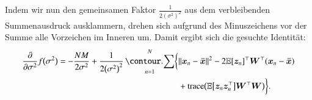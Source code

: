 Indem wir nun den gemeinsamen Faktor $\frac{1}{2(\sigma^2)^2}$ aus dem verbleibenden Summenausdruck ausklammern, drehen sich aufgrund des Minuszeichens vor der Summe alle Vorzeichen im Inneren um. Damit ergibt sich die gesuchte Identität:
\begin{equation*}
    	\begin{split}
        		\frac{\partial}{\partial \sigma^2} f\bigl( \sigma^2 \bigr)
			= -\frac{N M}{2 \sigma^2} + \frac{1}{2 \bigl( \sigma^2 \bigr)^2} \sum_{n=1}^N \biggl\{
                		&\Vert \bx_n - \bxmean \Vert^2 - 2 \E[\bz_n]^\top \bW^\top (\bx_n - \bxmean)
	\\
                		&+ \trace\bigl( \E\bigl[ \bz_n \bz_n^\top \bigr] \bW^\top \bW \bigr)
            	\biggr\}.
	\end{split}
\end{equation*}


\newpage